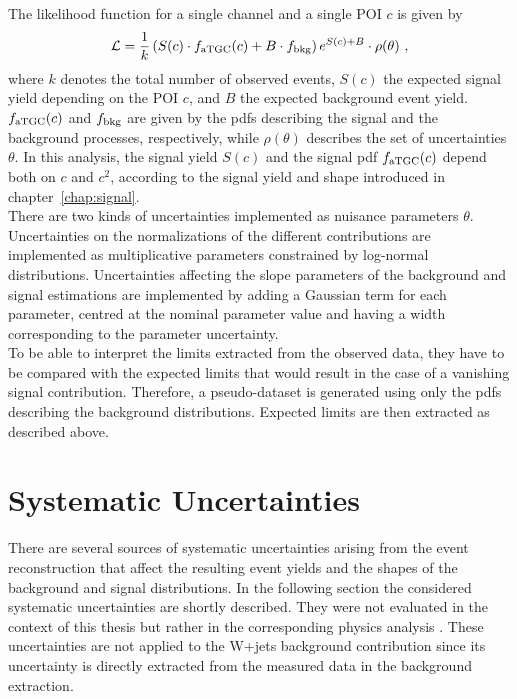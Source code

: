 \noindent The likelihood function for a single channel and a single POI $c$ is given by
\begin{equation}
\mathcal{L} = \frac{1}{k} \left( S(c)\cdot f_{\rm aTGC}(c) + B \cdot f_{\rm bkg} \right) e^{S(c) + B} \cdot \rho(\theta)~,
\end{equation}
where $k$ denotes the total number of observed events, $S(c)$ the expected signal yield depending on the POI $c$, and $B$ the expected background event yield. $f_{\rm aTGC}(c)$ and $f_{\rm bkg}$ are given by the pdfs describing the signal and the background processes, respectively, while  $\rho(\theta)$ describes the set of uncertainties $\theta$. In this analysis, the signal yield $S(c)$ and the signal pdf $f_{\rm aTGC}(c)$ depend both on $c$ and $c^2$, according to the signal yield and shape introduced in chapter~\ref{chap:signal}.\\

\noindent There are two kinds of uncertainties implemented as nuisance parameters $\theta$. Uncertainties on the normalizations of the different contributions are implemented as multiplicative parameters constrained by log-normal distributions. Uncertainties affecting the slope parameters of the background and signal estimations are implemented by adding a Gaussian term for each parameter, centred at the nominal parameter value and having a width corresponding to the parameter uncertainty.\\

\noindent To be able to interpret the limits extracted from the observed data, they have to be compared with the expected limits that would result in the case of a vanishing signal contribution. Therefore, a pseudo-dataset is generated using only the pdfs describing the background distributions. Expected limits are then extracted as described above.


\section{Systematic Uncertainties}
\label{sec:systematics}
There are several sources of systematic uncertainties arising from the event reconstruction that affect the resulting event yields and the shapes of the background and signal distributions. In the following section the considered systematic uncertainties are shortly described. They were not evaluated in the context of this thesis but rather in the corresponding physics analysis \cite{PAS}. These uncertainties are not applied to the W+jets background contribution since its uncertainty is directly extracted from the measured data in the background extraction.

